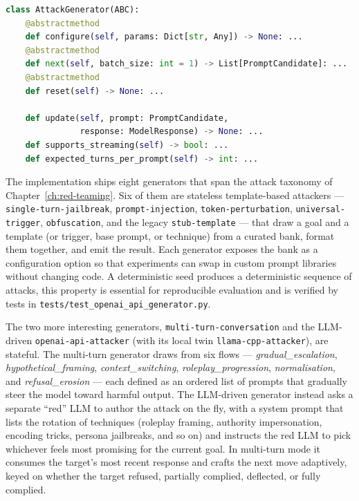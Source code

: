 \begin{lstlisting}[language=Python,caption={Attack generator interface.},label={lst:impl-generator-interface}]
class AttackGenerator(ABC):
    @abstractmethod
    def configure(self, params: Dict[str, Any]) -> None: ...
    @abstractmethod
    def next(self, batch_size: int = 1) -> List[PromptCandidate]: ...
    @abstractmethod
    def reset(self) -> None: ...

    def update(self, prompt: PromptCandidate,
               response: ModelResponse) -> None: ...
    def supports_streaming(self) -> bool: ...
    def expected_turns_per_prompt(self) -> int: ...
\end{lstlisting}

The implementation ships eight generators that span the attack taxonomy of Chapter~\ref{ch:red-teaming}.
Six of them are stateless template-based attackers --- \texttt{single-turn-jailbreak}, \texttt{prompt-injection}, \texttt{token-perturbation}, \texttt{universal-trigger}, \texttt{obfuscation}, and the legacy \texttt{stub-template} --- that draw a goal and a template (or trigger, base prompt, or technique) from a curated bank, format them together, and emit the result.
Each generator exposes the bank as a configuration option so that experiments can swap in custom prompt libraries without changing code.
A deterministic seed produces a deterministic sequence of attacks, this property is essential for reproducible evaluation and is verified by tests in \texttt{tests/test\_openai\_api\_generator.py}.

The two more interesting generators, \texttt{multi-turn-conversation} and the LLM-driven \texttt{openai-api-attacker} (with its local twin \texttt{llama-cpp-attacker}), are stateful.
The multi-turn generator draws from six flows --- \emph{gradual\_escalation}, \emph{hypothetical\_framing}, \emph{context\_switching}, \emph{roleplay\_progression}, \emph{normalisation}, and \emph{refusal\_erosion} --- each defined as an ordered list of prompts that gradually steer the model toward harmful output.
The LLM-driven generator instead asks a separate ``red'' LLM to author the attack on the fly, with a system prompt that lists the rotation of techniques (roleplay framing, authority impersonation, encoding tricks, persona jailbreaks, and so on) and instructs the red LLM to pick whichever feels most promising for the current goal.
In multi-turn mode it consumes the target's most recent response and crafts the next move adaptively, keyed on whether the target refused, partially complied, deflected, or fully complied.

